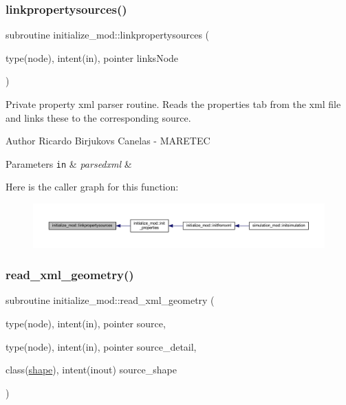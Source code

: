 \subsubsection{\texorpdfstring{linkpropertysources()}{linkpropertysources()}}
{\footnotesize\ttfamily subroutine initialize\+\_\+mod\+::linkpropertysources (\begin{DoxyParamCaption}\item[{type(node), intent(in), pointer}]{links\+Node }\end{DoxyParamCaption})\hspace{0.3cm}{\ttfamily [private]}}



Private property xml parser routine. Reads the properties tab from the xml file and links these to the corresponding source. 

\begin{DoxyAuthor}{Author}
Ricardo Birjukovs Canelas -\/ M\+A\+R\+E\+T\+EC 
\end{DoxyAuthor}

\begin{DoxyParams}[1]{Parameters}
\mbox{\tt in}  & {\em parsedxml} & \\
\hline
\end{DoxyParams}
Here is the caller graph for this function\+:\nopagebreak
\begin{figure}[H]
\begin{center}
\leavevmode
\includegraphics[width=350pt]{namespaceinitialize__mod_af38ade977df8d56db1d125bc4cc03a4a_icgraph}
\end{center}
\end{figure}
\mbox{\label{namespaceinitialize__mod_aebe8236f74bc6665b16463683c478602}} 
\subsubsection{\texorpdfstring{read\+\_\+xml\+\_\+geometry()}{read\_xml\_geometry()}}
{\footnotesize\ttfamily subroutine initialize\+\_\+mod\+::read\+\_\+xml\+\_\+geometry (\begin{DoxyParamCaption}\item[{type(node), intent(in), pointer}]{source,  }\item[{type(node), intent(in), pointer}]{source\+\_\+detail,  }\item[{class(\hyperlink{structgeometry__mod_1_1shape}{shape}), intent(inout)}]{source\+\_\+shape }\end{DoxyParamCaption})\hspace{0.3cm}{\ttfamily [private]}}



